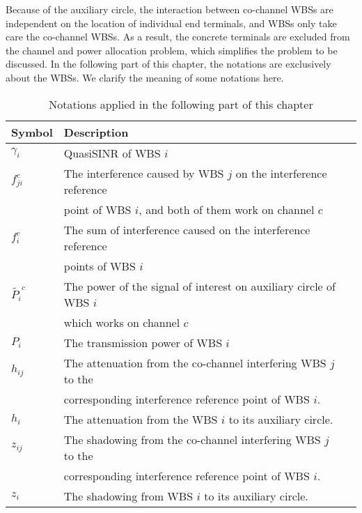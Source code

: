 Because of the auxiliary circle, the interaction between co-channel WBSs are independent on the location of individual end terminals, and WBSs only take care the co-channel WBSs. 
As a result,  the concrete terminals are excluded from the channel and power allocation problem, which simplifies the problem to be discussed. 
In the following part of this chapter, the notations are exclusively about the WBSs.
We clarify the meaning of some notations here.

\begin{table}[h]
\caption{Notations applied in the following part of this chapter}
\label{tab1}
\centering
\begin{tabular}{llr}
\toprule
Symbol & Description \\
\midrule
$\gamma_i$ & QuasiSINR of WBS $i$\\
$f_{ji}^c$  & The interference caused by WBS $j$ on the interference reference \\
			& point of WBS $i$, and both of them work on channel $c$\\
$f_i^c$ & The sum of interference caused on the interference reference \\
			& points of WBS $i$ \\
$\tilde{P_i}^c$ & The power of the signal of interest on auxiliary circle of WBS $i$ \\
			& which works on channel $c$     \\
$P_i$		& The transmission power of WBS $i$\\
$h_{ij}$ & The attenuation from the co-channel interfering WBS $j$ to the \\
		& corresponding interference reference point of WBS $i$.\\
$h_{i}$ & The attenuation from the WBS $i$ to its auxiliary circle.\\
$z_{ij}$ & The shadowing from the co-channel interfering  WBS $j$ to the\\
		& corresponding interference reference point of WBS $i$.\\
$z_{i}$ & The shadowing from WBS $i$ to its auxiliary circle.\\		
\bottomrule
\end{tabular}
\end{table}

